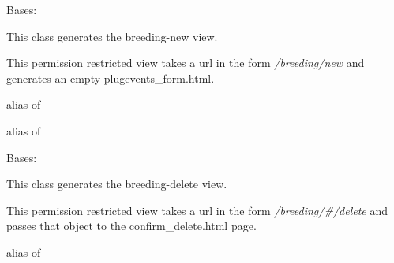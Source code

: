 \documentclass[letterpaper,10pt,english]{sphinxmanual}
\begin{document}
\begin{fulllineitems}
\label{api:mousedb.animal.views.BreedingCreate}
Bases: {\hyperref[api:mousedb.views.RestrictedCreateView]{}}

This class generates the breeding-new view.

This permission restricted view takes a url in the form \emph{/breeding/new} and generates an empty plugevents\_form.html.


\begin{fulllineitems}
\label{api:mousedb.animal.views.BreedingCreate.form_class}
alias of 

\end{fulllineitems}



\begin{fulllineitems}
\label{api:mousedb.animal.views.BreedingCreate.model}
alias of 

\end{fulllineitems}


\end{fulllineitems}



\begin{fulllineitems}
\label{api:mousedb.animal.views.BreedingDelete}
Bases: {\hyperref[api:mousedb.views.RestrictedDeleteView]{}}

This class generates the breeding-delete view.

This permission restricted view takes a url in the form \emph{/breeding/\#/delete} and passes that object to the confirm\_delete.html page.


\begin{fulllineitems}
\label{api:mousedb.animal.views.BreedingDelete.model}
alias of 

\end{fulllineitems}


\end{fulllineitems}
\end{document}
